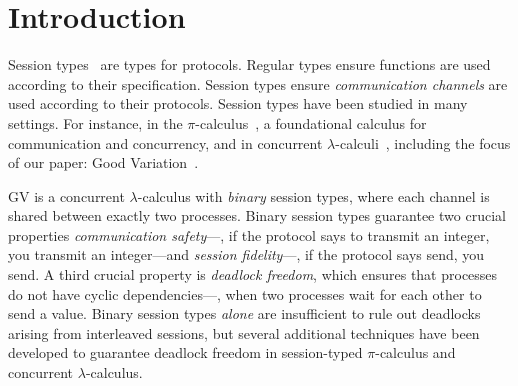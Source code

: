 \documentclass[main.tex]{subfiles}
\begin{document}
\section{Introduction}
Session types~\cite{honda93,takeuchihonda94,hondavasconcelos98} are types for protocols. Regular types ensure functions are used according to their specification. Session types ensure \emph{communication channels} are used according to their protocols. Session types have been studied in many settings. For instance, in the $\pi$-calculus~\cite{honda93,takeuchihonda94,hondavasconcelos98}, a foundational calculus for communication and concurrency, and in concurrent $\lambda$-calculi~\cite{gayvasconcelos12}, including the focus of our paper: Good Variation~\cite[GV]{wadler15,lindleymorris15}.

GV is a concurrent $\lambda$-calculus with \emph{binary} session types, where each channel is shared between exactly two processes. Binary session types guarantee two crucial properties \emph{communication safety}---\eg, if the protocol says to transmit an integer, you transmit an integer---and \emph{session fidelity}---\eg, if the protocol says send, you send. A third crucial property is \emph{deadlock freedom}, which ensures that processes do not have cyclic dependencies---\eg, when two processes wait for each other to send a value. Binary session types \emph{alone} are insufficient to rule out deadlocks arising from interleaved sessions, but several additional techniques have been developed to guarantee deadlock freedom in session-typed $\pi$-calculus and concurrent $\lambda$-calculus.
\end{document}
